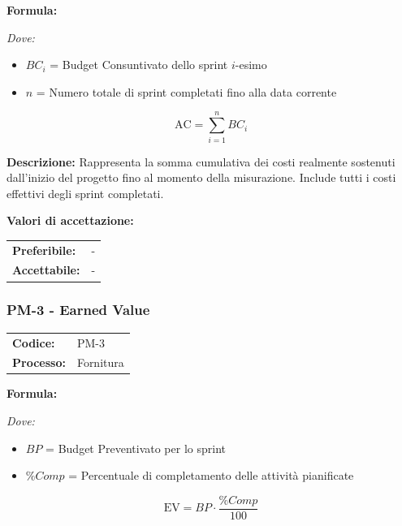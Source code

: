 \documentclass[a4paper,11pt,oneside]{scrartcl}
\begin{document}
\vspace{0.3cm}
\noindent\textbf{Formula:}

\noindent\textit{Dove:}
\begin{itemize}[leftmargin=1.5cm, topsep=0pt, itemsep=0pt]
    \item $BC_i$ = Budget Consuntivato dello sprint $i$-esimo
    \item $n$ = Numero totale di sprint completati fino alla data corrente
\end{itemize}

\[
\text{AC} = \sum_{i=1}^{n} BC_i
\]

\noindent\textbf{Descrizione:} Rappresenta la somma cumulativa dei costi realmente sostenuti dall'inizio del progetto fino al momento della misurazione. Include tutti i costi effettivi degli sprint completati.

\vspace{0.2cm}
\noindent\textbf{Valori di accettazione:}
\vspace{0.1cm}

\noindent
\begin{tabular}{@{}ll@{}}
\textbf{Preferibile:} & - \\
\textbf{Accettabile:} & - \\
\end{tabular}

\subsubsection{PM-3 - Earned Value}

\noindent
\begin{tabular}{@{}p{}p{}@{}}
\textbf{Codice:} & PM-3 \\
\textbf{Processo:} & Fornitura \\
\end{tabular}

\vspace{0.3cm}
\noindent\textbf{Formula:}

\noindent\textit{Dove:}
\begin{itemize}[leftmargin=1.5cm, topsep=0pt, itemsep=0pt]
    \item $BP$ = Budget Preventivato per lo sprint
    \item $\%Comp$ = Percentuale di completamento delle attività pianificate
\end{itemize}

\[
\text{EV} = BP \cdot \frac{\%Comp}{100}
\]
\end{document}
